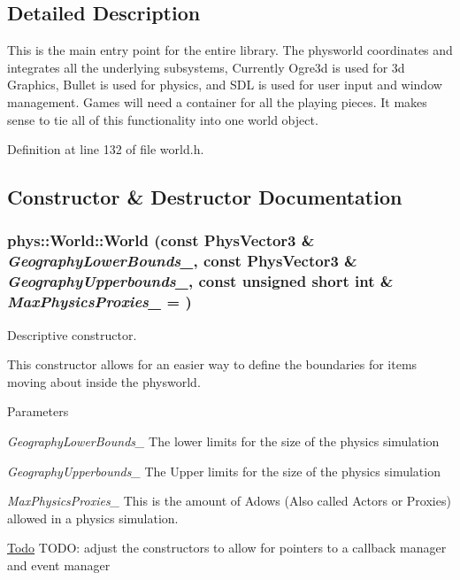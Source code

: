 \subsection{Detailed Description}
This is the main entry point for the entire library. The physworld coordinates and integrates all the underlying subsystems, Currently Ogre3d is used for 3d Graphics, Bullet is used for physics, and SDL is used for user input and window management. Games will need a container for all the playing pieces. It makes sense to tie all of this functionality into one world object. 

Definition at line 132 of file world.h.



\subsection{Constructor \& Destructor Documentation}
\hypertarget{classphys_1_1World_a1f020a5a49a3bbfca6d570db44e72beb}{
\subsubsection[{World}]{\setlength{\rightskip}{0pt plus 5cm}phys::World::World (const {\bf PhysVector3} \& {\em GeographyLowerBounds\_\-}, \/  const {\bf PhysVector3} \& {\em GeographyUpperbounds\_\-}, \/  const unsigned short int \& {\em MaxPhysicsProxies\_\-} = {})}}
\label{da/ddf/classphys_1_1World_a1f020a5a49a3bbfca6d570db44e72beb}


Descriptive constructor. 

This constructor allows for an easier way to define the boundaries for items moving about inside the physworld. 
\begin{DoxyParams}{Parameters}
\item[{\em GeographyLowerBounds\_\-}]The lower limits for the size of the physics simulation \item[{\em GeographyUpperbounds\_\-}]The Upper limits for the size of the physics simulation \item[{\em MaxPhysicsProxies\_\-}]This is the amount of Adows (Also called Actors or Proxies) allowed in a physics simulation.\end{DoxyParams}
\begin{Desc}
\item[\hyperlink{todo__todo000015}{Todo}]TODO: adjust the constructors to allow for pointers to a callback manager and event manager \end{Desc}


